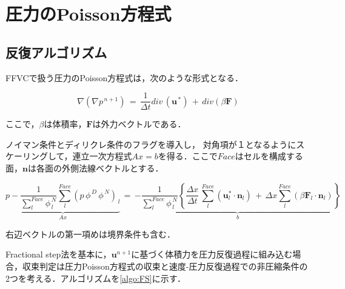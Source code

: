 \graphicspath{{./fig_EBCS/}}
%
\section{圧力のPoisson方程式}

\subsection{反復アルゴリズム}

FFVCで扱う圧力のPoisson方程式は，次のような形式となる．

\begin{equation}
\nabla \left( \nabla p^{\,n+1} \right) \,=\, \frac{1}{\Delta t} div\, ( \bm{u}^{\,*}) \,+\, div( \beta \bm{F} )
\label{eq:Poisson_ffvc}
\end{equation}


\noindent ここで，$\beta$は体積率，$\bm{F}$は外力ベクトルである．

ノイマン条件とディリクレ条件のフラグを導入し，
対角項が１となるようにスケーリングして，連立一次方程式$Ax = b$を得る．ここで$Face$はセルを構成する面，$\bm{n}$は各面の外側法線ベクトルとする．

\begin{equation}
\underbrace{ p  -  \frac{1}{\sum \limits_{l}^{Face} \phi^{\,N}_{\,l}} \sum \limits_l^{Face} {\left( p \,\phi^{\,D} \,\phi^{\,N} \right)}_{\,l} } \limits_{A x }
\,=\,
 \displaystyle { 
\underbrace{ -
\frac{1}{\sum \limits_l^{Face} \phi^{\,N}_{\,l}} 
\left\{ 
\frac{\Delta x}{\Delta t} \,\sum \limits_l^{Face} \left( \bm{u}^*_l \cdot \bm{n}_l \right)
\,+\, 
\Delta x \sum \limits_l^{Face} \left( \beta \bm{F}_l \cdot \bm{n}_l \right)
\right\}
} \limits_{ b }
}
\label{eq:ebcs_poisson-discrete}
\end{equation}

\noindent 右辺ベクトルの第一項めは境界条件も含む．


Fractional step法を基本に，$\bm{u}^{n+1}$に基づく体積力を圧力反復過程に組み込む場合，収束判定は圧力Poisson方程式の収束と速度-圧力反復過程での非圧縮条件の2つを考える．アルゴリズムを\ref{algo:FS}に示す．

